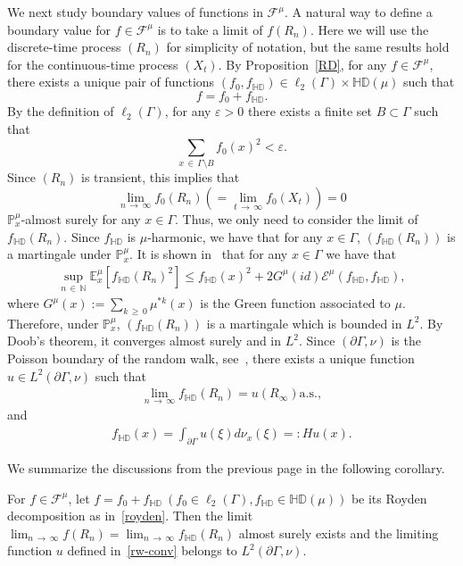 \documentclass[AHL,Unicode,longabstracts,published]{cedram}
\newcommand{\ce}{\mathcal{E}}
\newcommand{\cf}{\mathcal{F}}
\newcommand{\bp}{\mathbb{P}}
\newcommand{\bn}{\mathbb{N}}
\newcommand{\be}{\mathbb{E}}
\newcommand{\bHD}{\mathbb{HD}}
\begin{document}
We next study boundary values of functions in $\cf^{\mu}$. A natural way to define a boundary value for $f\in\cf^{\mu}$ is to take a limit of $f(R_n)$. Here we will use the discrete-time process $(R_n)$ for simplicity of notation, but the same results hold for the continuous-time process $(X_t)$. By Proposition~\ref{RD}, for any $f\in\cf^{\mu}$, there exists a unique pair of functions $(f_0,f_{\bHD})\in\ell_2(\Gamma)\times
\bHD(\mu)$ such that
\[
f=f_0+f_{\bHD}.
\]
By the definition of $\ell_2(\Gamma)$, for any $\varepsilon>0$ there exists a finite set $B\subset \Gamma$ such that
\[
\sum_{x\,\in\,\Gamma\setminus B}f_0(x)^2<\varepsilon.
\]
Since $(R_n)$ is transient, this implies that
\[
\lim_{n\,\to\,\infty}f_0(R_n)\left(=\lim_{t\,\to\,\infty}f_0(X_t)\right)=0
\]
$\bp^{\mu}_x$-almost surely for any $x\in\Gamma$. Thus, we only need to consider the limit of $f_{\bHD}(R_n)$. Since $f_{\bHD}$ is $\mu$-harmonic, we have that for any $x\in\Gamma$, $(f_{\bHD}(R_n))$ is a martingale under $\bp^{\mu}_x$. It is shown in~\cite[Theorem~9.11]{LP} that for any $x\in\Gamma$ we have that
\begin{align*}
\sup_{n\,\in\,\bn}\be^{\mu}_x\left[f_{\bHD}(R_n)^2\right]\leq f_{\bHD}(x)^2+2G^{\mu}(id)
\ce^{\mu}(f_{\bHD},f_{\bHD}),
\end{align*}
where $G^{\mu}(x):=\sum_{k\,\geq\,0}\mu^{*k}(x)$ is the Green function associated to $\mu$. Therefore, under $\bp^{\mu}_x$, $(f_{\bHD}(R_n))$ is a martingale which is bounded in $L^2$. By Doob's theorem, it converges almost surely and in $L^2$. Since $(\partial\Gamma,\nu)$ is the Poisson boundary of the random walk, see~\cite{Ka}, there exists a unique function $u\in L^2(\partial\Gamma,\nu)$ such that
\begin{align}\label{rw-conv}
\lim_{n\,\to\,\infty}f_{\bHD}(R_n)=u(R_{\infty})\text{a.s.},
\end{align}
and
\begin{align}\label{he}
f_{\bHD}(x)=\int_{\partial\Gamma}u(\xi)d\nu_x(\xi)=:Hu(x).
\end{align}


We summarize the discussions from the previous page in the following corollary.
\begin{coro}\label{new}
For $f\in\cf^\mu$, let $f=f_0+f_{\bHD}\ (f_0\in\ell_2(\Gamma),f_{\bHD}\in\bHD(\mu))$ be its Royden decomposition as in~\eqref{royden}. Then the limit $\lim_{n\,\to\,\infty} f(R_n)=\lim_{n\,\to\,\infty} f_{\bHD}(R_n)$ almost surely exists and the limiting function $u$ defined in~\eqref{rw-conv} belongs to $L^2(\partial \Gamma,\nu)$.
\end{coro}
\end{document}
